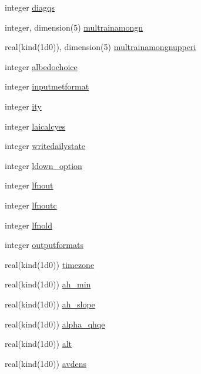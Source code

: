 \begin{DoxyCompactItemize}
\item 
integer \hyperlink{namespacedata__in_a2202e62dbdf6e4d935d472a09af97460}{diagqs}
\item 
integer, dimension(5) \hyperlink{namespacedata__in_a418fc51e58d7116a1764af37aba7b65f}{multrainamongn}
\item 
real(kind(1d0)), dimension(5) \hyperlink{namespacedata__in_a3473c34f53886b8fc852e23b09fc2add}{multrainamongnupperi}
\item 
integer \hyperlink{namespacedata__in_a95db274f3821ba4b3b2799481c2484f7}{albedochoice}
\item 
integer \hyperlink{namespacedata__in_a4abd9462bcbb39b3cab15d64ebe71995}{inputmetformat}
\item 
integer \hyperlink{namespacedata__in_a71e2da70dfd1593a6a4770f164bcc146}{ity}
\item 
integer \hyperlink{namespacedata__in_a3c3027e7975cd18122a58ae965ee0f86}{laicalcyes}
\item 
integer \hyperlink{namespacedata__in_adf35232d8407e784ed41dc8f09ffe171}{writedailystate}
\item 
integer \hyperlink{namespacedata__in_a7ee5c5c530300f6627f86b6cbde2d5b9}{ldown\+\_\+option}
\item 
integer \hyperlink{namespacedata__in_ad453037bad2cda84e61ec000bdd004aa}{lfnout}
\item 
integer \hyperlink{namespacedata__in_a0189adce2d060aee708a9216b5c771e2}{lfnoutc}
\item 
integer \hyperlink{namespacedata__in_a3b953424146f8076e9fec820cd6f31d2}{lfnold}
\item 
integer \hyperlink{namespacedata__in_afeae0c4bf24c4eea3af4a7fded472b26}{outputformats}
\item 
real(kind(1d0)) \hyperlink{namespacedata__in_ae7c74e8cbd3c208e00306eafe50a98c0}{timezone}
\item 
real(kind(1d0)) \hyperlink{namespacedata__in_a711f2f13bee1efd47bef091504e3621d}{ah\+\_\+min}
\item 
real(kind(1d0)) \hyperlink{namespacedata__in_ac10bf0a69520b391a81ee64742a4f6fd}{ah\+\_\+slope}
\item 
real(kind(1d0)) \hyperlink{namespacedata__in_a6ecf207ff2ecfcb35e223ad4e761ff9b}{alpha\+\_\+qhqe}
\item 
real(kind(1d0)) \hyperlink{namespacedata__in_a1f542f63d48efee0cd1e356f9f3ea1cf}{alt}
\item 
real(kind(1d0)) \hyperlink{namespacedata__in_abf271c3057b02dd9183e4442954c9577}{avdens}
\item 

\end{DoxyCompactItemize}

